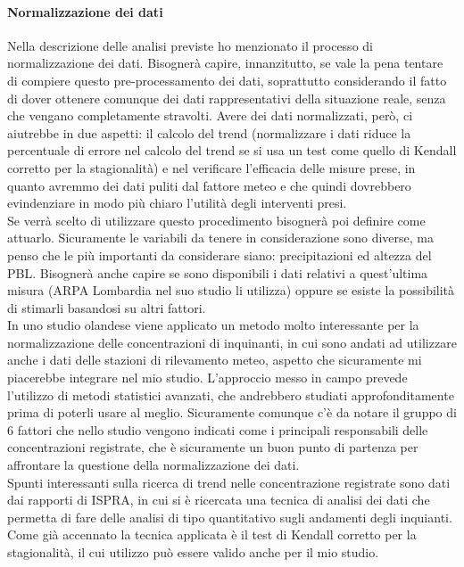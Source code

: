 \documentclass{article}
\begin{document}
\paragraph{Normalizzazione dei dati}
Nella descrizione delle analisi previste ho menzionato il processo di normalizzazione dei dati. Bisognerà capire, innanzitutto, se vale la pena tentare di compiere questo pre-processamento dei dati, soprattutto considerando il fatto di dover ottenere comunque dei dati rappresentativi della situazione reale, senza che vengano completamente stravolti. Avere dei dati normalizzati, però, ci aiutrebbe in due aspetti: il calcolo del trend (normalizzare i dati riduce la percentuale di errore nel calcolo del trend se si usa un test come quello di Kendall corretto per la stagionalità) e nel verificare l'efficacia delle misure prese, in quanto avremmo dei dati puliti dal fattore meteo e che quindi dovrebbero evindenziare in modo più chiaro l'utilità degli interventi presi.
\\Se verrà scelto di utilizzare questo procedimento bisognerà poi definire come attuarlo. Sicuramente le variabili da tenere in considerazione sono diverse, ma penso che le più importanti da considerare siano: precipitazioni ed altezza del PBL. Bisognerà anche capire se sono disponibili i dati relativi a quest'ultima misura (ARPA Lombardia nel suo studio\cite{arpaCovid} li utilizza) oppure se esiste la possibilità di stimarli basandosi su altri fattori.
\\In uno studio olandese\cite{hoogerbrugge2010trends} viene applicato un metodo molto interessante per la normalizzazione delle concentrazioni di inquinanti, in cui sono andati ad utilizzare anche i dati delle stazioni di rilevamento meteo, aspetto che sicuramente mi piacerebbe integrare nel mio studio. L'approccio messo in campo prevede l'utilizzo di metodi statistici avanzati, che andrebbero studiati approfonditamente prima di poterli usare al meglio. Sicuramente comunque c'è da notare il gruppo di 6 fattori che nello studio vengono indicati come i principali responsabili delle concentrazioni registrate, che è sicuramente un buon punto di partenza per affrontare la questione della normalizzazione dei dati.
\\Spunti interessanti sulla ricerca di trend nelle concentrazione registrate sono dati dai rapporti di ISPRA\cite{cattani2018analisi}\cite{cattani2014analisi}, in cui si è ricercata una tecnica di analisi dei dati che permetta di fare delle analisi di tipo quantitativo sugli andamenti degli inquianti. Come già accennato la tecnica applicata è il test di Kendall corretto per la stagionalità, il cui utilizzo può essere valido anche per il mio studio.
\end{document}
